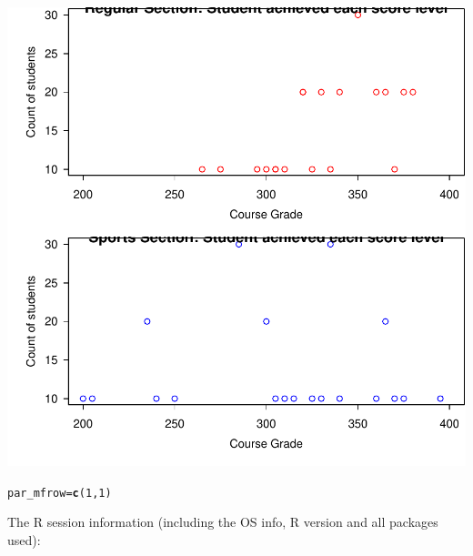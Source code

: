 \documentclass{article}\usepackage[]{graphicx}\usepackage[]{xcolor}
\makeatletter
\newcommand{\hlnum}[1]{\textcolor[rgb]{0.686,0.059,0.569}{#1}}%
\newcommand{\hlstd}[1]{\textcolor[rgb]{0.345,0.345,0.345}{#1}}%
\newcommand{\hlkwb}[1]{\textcolor[rgb]{0.69,0.353,0.396}{#1}}%
\newcommand{\hlkwd}[1]{\textcolor[rgb]{0.737,0.353,0.396}{\textbf{#1}}}%
\newenvironment{kframe}{%
 \def\at@end@of@kframe{}%
 \ifinner\ifhmode%
  \def\at@end@of@kframe{\end{minipage}}%
  \begin{minipage}{\columnwidth}%
 \fi\fi%
 \def\FrameCommand##1{\hskip\@totalleftmargin \hskip-\fboxsep
 \colorbox{shadecolor}{##1}\hskip-\fboxsep
     \hskip-\linewidth \hskip-\@totalleftmargin \hskip\columnwidth}%
 \MakeFramed {\advance\hsize-\width
   \@totalleftmargin\z@ \linewidth\hsize
   \@setminipage}}%
 {\par\unskip\endMakeFramed%
 \at@end@of@kframe}
\newenvironment{knitrout}{}{} %
\makeatother
\begin{document}
\begin{knitrout}
{\centering \includegraphics[width=.6\linewidth]{figure/DSC520-week-4-Testscore-TangXin-Rnwauto-report-1} 

}


\begin{kframe}\begin{alltt}
\hlstd{par_mfrow} \hlkwb{=} \hlkwd{c}\hlstd{(}\hlnum{1}\hlstd{,} \hlnum{1}\hlstd{)}
\end{alltt}
\end{kframe}
\end{knitrout}

The R session information (including the OS info, R version and all
packages used):
\end{document}
